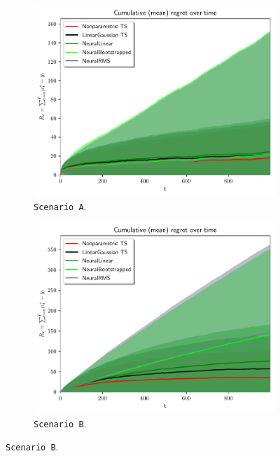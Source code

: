 \begin{figure}[!ht]
	\centering
	\begin{subfigure}[c]{0.45\textwidth}
		\includegraphics[width=\textwidth]{./figs/linear_gaussian_mixture_easy_baselines/cum_optexpected_regret_top_five_std}
		\vspace*{-5ex}
		\caption{\texttt{Scenario A}.}
		\label{fig:scenario_A_baselines_top}
	\end{subfigure}
	\begin{subfigure}[c]{0.45\textwidth}
		\includegraphics[width=\textwidth]{./figs/linear_gaussian_mixture_hard_baselines/cum_optexpected_regret_top_five_std}
		\vspace*{-5ex}
		\caption{\texttt{Scenario B}.}
		\label{fig:scenario_B_baselines_top}
	\end{subfigure}
	

\end{figure}
